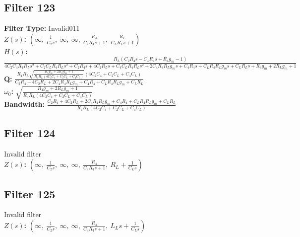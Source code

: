 \documentclass{article}
\begin{document}
\subsection*{Filter 123}
\textbf{Filter Type:} Invalid011 \\ 
\textbf{$Z(s)$:} $\left( \infty, \  \frac{1}{C_{2} s}, \  \infty, \  \infty, \  \frac{R_{4}}{C_{4} R_{4} s + 1}, \  \frac{R_{L}}{C_{L} R_{L} s + 1}\right)$ \\ 
\textbf{$H(s)$:} $\frac{R_{L} \left(C_{2} R_{4} s - C_{4} R_{4} s + R_{4} g_{m} - 1\right)}{4 C_{2} C_{4} R_{4} R_{L} s^{2} + C_{2} C_{L} R_{4} R_{L} s^{2} + C_{2} R_{4} s + 4 C_{2} R_{L} s + C_{4} C_{L} R_{4} R_{L} s^{2} + 2 C_{4} R_{4} R_{L} g_{m} s + C_{4} R_{4} s + C_{L} R_{4} R_{L} g_{m} s + C_{L} R_{L} s + R_{4} g_{m} + 2 R_{L} g_{m} + 1}$ \\ 
\textbf{Q:} $\frac{R_{4} R_{L} \sqrt{\frac{R_{4} g_{m} + 2 R_{L} g_{m} + 1}{R_{4} R_{L} \left(4 C_{2} C_{4} + C_{2} C_{L} + C_{4} C_{L}\right)}} \left(4 C_{2} C_{4} + C_{2} C_{L} + C_{4} C_{L}\right)}{C_{2} R_{4} + 4 C_{2} R_{L} + 2 C_{4} R_{4} R_{L} g_{m} + C_{4} R_{4} + C_{L} R_{4} R_{L} g_{m} + C_{L} R_{L}}$ \\ 
\textbf{$\omega_0$:} $\sqrt{\frac{R_{4} g_{m} + 2 R_{L} g_{m} + 1}{R_{4} R_{L} \left(4 C_{2} C_{4} + C_{2} C_{L} + C_{4} C_{L}\right)}}$ \\ 
\textbf{Bandwidth:} $\frac{C_{2} R_{4} + 4 C_{2} R_{L} + 2 C_{4} R_{4} R_{L} g_{m} + C_{4} R_{4} + C_{L} R_{4} R_{L} g_{m} + C_{L} R_{L}}{R_{4} R_{L} \left(4 C_{2} C_{4} + C_{2} C_{L} + C_{4} C_{L}\right)}$ \\ 
\subsection*{Filter 124}
Invalid filter \\ 
\textbf{$Z(s)$:} $\left( \infty, \  \frac{1}{C_{2} s}, \  \infty, \  \infty, \  \frac{R_{4}}{C_{4} R_{4} s + 1}, \  R_{L} + \frac{1}{C_{L} s}\right)$ \\ 
\subsection*{Filter 125}
Invalid filter \\ 
\textbf{$Z(s)$:} $\left( \infty, \  \frac{1}{C_{2} s}, \  \infty, \  \infty, \  \frac{R_{4}}{C_{4} R_{4} s + 1}, \  L_{L} s + \frac{1}{C_{L} s}\right)$ \\ 
\end{document}

